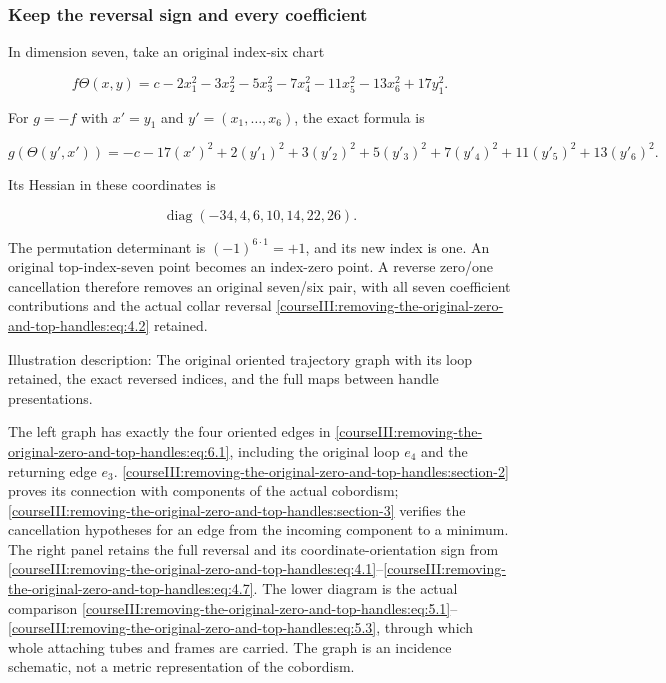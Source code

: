 \subsubsection{Keep the reversal sign and every coefficient}
\label{courseIII:removing-the-original-zero-and-top-handles:section-6.2}

\label{courseIII:zero-top:6.2}

In dimension seven, take an original index-six chart

\begin{equation}
f\Theta(x,y)=
 c-2x_1^2-3x_2^2-5x_3^2-7x_4^2-11x_5^2-13x_6^2
 +17y_1^2.
 \label{courseIII:removing-the-original-zero-and-top-handles:eq:6.3}
\end{equation}

For \(g=-f\) with \(x'=y_1\) and
\(y'=(x_1,\ldots,x_6)\), the exact formula is

\begin{equation}
g(\Theta(y',x'))=
 -c-17(x')^2
 +2(y'_1)^2+3(y'_2)^2+5(y'_3)^2
 +7(y'_4)^2+11(y'_5)^2+13(y'_6)^2.
 \label{courseIII:removing-the-original-zero-and-top-handles:eq:6.4}
\end{equation}

Its Hessian in these coordinates is

\begin{equation}
\operatorname{diag}(-34,4,6,10,14,22,26).
 \label{courseIII:removing-the-original-zero-and-top-handles:eq:6.5}
\end{equation}

The permutation determinant is \((-1)^{6\cdot1}=+1\), and its new index is one. An original top-index-seven point becomes an index-zero point. A reverse zero/one cancellation therefore removes an original seven/six pair, with all seven coefficient contributions and the actual collar reversal \eqref{courseIII:removing-the-original-zero-and-top-handles:eq:4.2} retained.

Illustration description: The original oriented trajectory graph with its loop retained, the exact reversed indices, and the full maps between handle presentations.

The left graph has exactly the four oriented edges in \eqref{courseIII:removing-the-original-zero-and-top-handles:eq:6.1}, including the original loop \(e_4\) and the returning edge \(e_3\). \cref{courseIII:removing-the-original-zero-and-top-handles:section-2} proves its connection with components of the actual cobordism; \cref{courseIII:removing-the-original-zero-and-top-handles:section-3} verifies the cancellation hypotheses for an edge from the incoming component to a minimum. The right panel retains the full reversal and its coordinate-orientation sign from \eqref{courseIII:removing-the-original-zero-and-top-handles:eq:4.1}--\eqref{courseIII:removing-the-original-zero-and-top-handles:eq:4.7}. The lower diagram is the actual comparison \eqref{courseIII:removing-the-original-zero-and-top-handles:eq:5.1}--\eqref{courseIII:removing-the-original-zero-and-top-handles:eq:5.3}, through which whole attaching tubes and frames are carried. The graph is an incidence schematic, not a metric representation of the cobordism.

